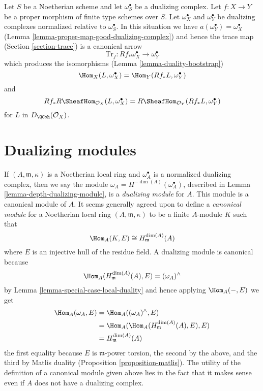 \begin{example}
\label{example-trace-proper}
Let $S$ be a Noetherian scheme and let $\omega_S^\bullet$ be a
dualizing complex. Let $f : X \to Y$ be a proper morphism of finite
type schemes over $S$. Let $\omega_X^\bullet$ and $\omega_Y^\bullet$
be dualizing complexes normalized relative to $\omega_S^\bullet$.
In this situation we have $a(\omega_Y^\bullet) = \omega_X^\bullet$
(Lemma \ref{lemma-proper-map-good-dualizing-complex})
and hence the trace map (Section \ref{section-trace}) is a canonical arrow
$$
\text{Tr}_f : Rf_*\omega_X^\bullet \longrightarrow \omega_Y^\bullet
$$
which produces the isomorphisms (Lemma \ref{lemma-duality-bootstrap})
$$
\Hom_X(L, \omega_X^\bullet) = \Hom_Y(Rf_*L, \omega_Y^\bullet)
$$
and
$$
Rf_*R\SheafHom_{\mathcal{O}_X}(L, \omega_X^\bullet) =
R\SheafHom_{\mathcal{O}_Y}(Rf_*L, \omega_Y^\bullet)
$$
for $L$ in $D_\QCoh(\mathcal{O}_X)$.
\end{example}




\section{Dualizing modules}
\label{section-dualizing-module}

\noindent
If $(A, \mathfrak m, \kappa)$ is a Noetherian local ring and
$\omega_A^\bullet$ is a normalized dualizing complex, then
we say the module $\omega_A = H^{-\dim(A)}(\omega_A^\bullet)$, described
in Lemma \ref{lemma-depth-dualizing-module}, is a {\it dualizing module}
for $A$. This module is a canonical module of $A$.
It seems generally agreed upon to define a {\it canonical module}
for a Noetherian local ring $(A, \mathfrak m, \kappa)$ to be
a finite $A$-module $K$ such that
$$
\Hom_A(K, E) \cong H^{\dim(A)}_\mathfrak m(A)
$$
where $E$ is an injective hull of the residue field. A dualizing
module is canonical because
$$
\Hom_A(H^{\dim(A)}_\mathfrak m(A), E) = (\omega_A)^\wedge
$$
by Lemma \ref{lemma-special-case-local-duality} and hence applying
$\Hom_A(-, E)$ we get
\begin{align*}
\Hom_A(\omega_A, E)
& =
\Hom_A((\omega_A)^\wedge, E) \\
& =
\Hom_A(\Hom_A(H^{\dim(A)}_\mathfrak m(A), E), E) \\
& = H^{\dim(A)}_\mathfrak m(A)
\end{align*}
the first equality because $E$ is $\mathfrak m$-power torsion, the
second by the above, and the third by Matlis duality
(Proposition \ref{proposition-matlis}). The utility of the definition
of a canonical module given above lies in the fact that it makes sense
even if $A$ does not have a dualizing complex.

